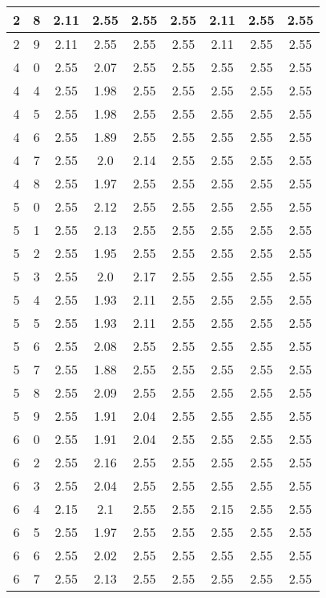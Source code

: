 \begin{longtable}{|c|c||c||c|c|c||c|c|c|}
	2 & 8 & 2.11 & 2.55 & 2.55 & 2.55 & 2.11 & 2.55 & 2.55 \\ \hline
	2 & 9 & 2.11 & 2.55 & 2.55 & 2.55 & 2.11 & 2.55 & 2.55 \\ \hline
	4 & 0 & 2.55 & 2.07 & 2.55 & 2.55 & 2.55 & 2.55 & 2.55 \\ \hline
	4 & 4 & 2.55 & 1.98 & 2.55 & 2.55 & 2.55 & 2.55 & 2.55 \\ \hline
	4 & 5 & 2.55 & 1.98 & 2.55 & 2.55 & 2.55 & 2.55 & 2.55 \\ \hline
	4 & 6 & 2.55 & 1.89 & 2.55 & 2.55 & 2.55 & 2.55 & 2.55 \\ \hline
	4 & 7 & 2.55 & 2.0 & 2.14 & 2.55 & 2.55 & 2.55 & 2.55 \\ \hline
	4 & 8 & 2.55 & 1.97 & 2.55 & 2.55 & 2.55 & 2.55 & 2.55 \\ \hline
	5 & 0 & 2.55 & 2.12 & 2.55 & 2.55 & 2.55 & 2.55 & 2.55 \\ \hline
	5 & 1 & 2.55 & 2.13 & 2.55 & 2.55 & 2.55 & 2.55 & 2.55 \\ \hline
	5 & 2 & 2.55 & 1.95 & 2.55 & 2.55 & 2.55 & 2.55 & 2.55 \\ \hline
	5 & 3 & 2.55 & 2.0 & 2.17 & 2.55 & 2.55 & 2.55 & 2.55 \\ \hline
	5 & 4 & 2.55 & 1.93 & 2.11 & 2.55 & 2.55 & 2.55 & 2.55 \\ \hline
	5 & 5 & 2.55 & 1.93 & 2.11 & 2.55 & 2.55 & 2.55 & 2.55 \\ \hline
	5 & 6 & 2.55 & 2.08 & 2.55 & 2.55 & 2.55 & 2.55 & 2.55 \\ \hline
	5 & 7 & 2.55 & 1.88 & 2.55 & 2.55 & 2.55 & 2.55 & 2.55 \\ \hline
	5 & 8 & 2.55 & 2.09 & 2.55 & 2.55 & 2.55 & 2.55 & 2.55 \\ \hline
	5 & 9 & 2.55 & 1.91 & 2.04 & 2.55 & 2.55 & 2.55 & 2.55 \\ \hline
	6 & 0 & 2.55 & 1.91 & 2.04 & 2.55 & 2.55 & 2.55 & 2.55 \\ \hline
	6 & 2 & 2.55 & 2.16 & 2.55 & 2.55 & 2.55 & 2.55 & 2.55 \\ \hline
	6 & 3 & 2.55 & 2.04 & 2.55 & 2.55 & 2.55 & 2.55 & 2.55 \\ \hline
	6 & 4 & 2.15 & 2.1 & 2.55 & 2.55 & 2.15 & 2.55 & 2.55 \\ \hline
	6 & 5 & 2.55 & 1.97 & 2.55 & 2.55 & 2.55 & 2.55 & 2.55 \\ \hline
	6 & 6 & 2.55 & 2.02 & 2.55 & 2.55 & 2.55 & 2.55 & 2.55 \\ \hline
	6 & 7 & 2.55 & 2.13 & 2.55 & 2.55 & 2.55 & 2.55 & 2.55 \\ \hline

\end{longtable}
